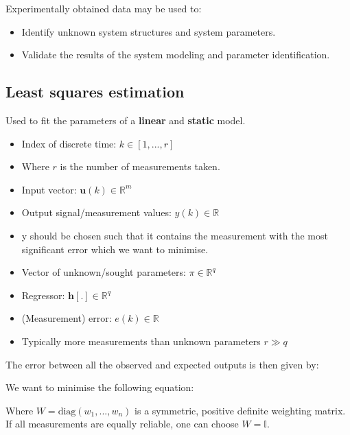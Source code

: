 \documentclass[10pt,a4paper]{scrartcl}
\begin{document}
\begin{multicols*}{3}
Experimentally obtained data may be used to:

\begin{itemize}
\ncompaq
\item Identify unknown system structures and system parameters.
\item Validate the results of the system modeling and parameter identification.
\end{itemize}


\subsection{Least squares estimation}

Used to fit the parameters of a \textbf{linear} and \textbf{static} model.


\begin{itemize}
\ncompaq
\item Index of discrete time: $k\in[1,...,r]$
\item Where $r$ is the number of measurements taken.
\item Input vector: $\mathbf{u}(k)\in\mathbb{R}^m$
\item Output signal/measurement values: $y(k)\in\mathbb{R}$
\item y should be chosen such that it contains the measurement with the most significant error which we want to minimise.
\item Vector of unknown/sought parameters: $\pi\in\mathbb{R}^q$
\item Regressor: $\mathbf{h[.]}\in\mathbb{R}^q$
\item (Measurement) error: $e(k)\in\mathbb{R}$
\item Typically more measurements than unknown parameters \dahe $r\gg q$
\end{itemize}

The error between all the observed and expected outputs is then given by:

\columnbreak

We want to minimise the following equation:


Where $W = \text{diag} (w_1, ..., w_n)$ is a symmetric, positive definite weighting matrix.
If all measurements are equally reliable, one can choose $W=\mathbb{I}$.


\end{multicols*}
\end{document}
